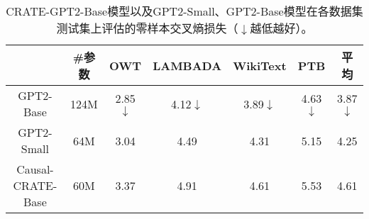 \documentclass[../../book-main.tex]{subfiles}
\begin{document}
\begin{table}
\def\arraystretch{1.1}
    \small
    \caption{\small CRATE-GPT2-Base模型以及GPT2-Small、GPT2-Base模型在各数据集测试集上评估的零样本交叉熵损失（$\downarrow$越低越好）。
    }
    \centering
    \begin{tabular}{ccccccc}
    \hline
    & \#参数 & \textbf{OWT} & \textbf{LAMBADA} & \textbf{WikiText} & \textbf{PTB} & \textbf{平均} \\
     \hline
     GPT2-Base  & {124M} & 2.85$\downarrow$ & 4.12$\downarrow$ & 3.89$\downarrow$ & 4.63$\downarrow$ & 3.87$\downarrow$ \\
     {GPT2-Small } &  {64M} & {3.04} & {4.49} & {4.31} & {5.15} & {4.25} \\
     Causal-CRATE-Base & {60M} & 3.37 & 4.91 & 4.61 & 5.53 & 4.61 \\
     \hline
    \end{tabular}
    \label{tab:gpt-eval}
\end{table} 






\end{document}
